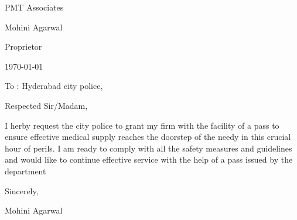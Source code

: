 \documentclass{article}
\begin{document}
\hspace*{0.9\linewidth}
\begin{minipage}{0.4\linewidth}
PMT Associates\par
Mohini Agarwal\par
Proprietor\par
\today
\end{minipage}
\vspace{10mm}

To : Hyderabad city police,  \par \bigskip

Respected Sir/Madam,  \par \bigskip

I herby request the city police to grant my firm with the facility of a pass to ensure effective medical supply reaches the doorstep of the needy in this crucial hour of perils. I am ready to comply with all the safety measures and guidelines and would like to continue effective service with the help of a pass issued by the department \par \bigskip


Sincerely, \par \smallskip
Mohini Agarwal 


\par
\end{document}
